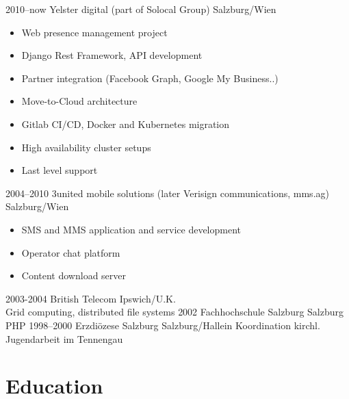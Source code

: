 \documentclass[]{cv-style}          %
\begin{document}
\begin{entrylist}
\entry
  {2010--now}
  {Yelster digital (part of Solocal Group)}
  {Salzburg/Wien}
  {
  \begin{itemize}
    \item Web presence management project
    \item Django Rest Framework, API development
    \item Partner integration (Facebook Graph, Google My Business..)
    \item Move-to-Cloud architecture
    \item Gitlab CI/CD, Docker and Kubernetes migration
    \item High availability cluster setups
    \item Last level support
  \end{itemize}}
\entry
  {2004--2010}
  {3united mobile solutions (later Verisign communications, mms.ag)}
  {Salzburg/Wien}
  {
  \begin{itemize}
    \item SMS and MMS application and service development
    \item Operator chat platform
    \item Content download server  
  \end{itemize}}
\entry
  {2003-2004}
  {British Telecom}
  {Ipswich/U.K.}
  {\\
  Grid computing, distributed file systems}
\entry
  {2002}
  {Fachhochschule Salzburg}
  {Salzburg}
  {
  PHP}
\entry
  {1998--2000}
  {Erzdiözese Salzburg}
  {Salzburg/Hallein}
  { 
  Koordination kirchl. Jugendarbeit im Tennengau}
\end{entrylist}


\section{Education}
\end{document}
